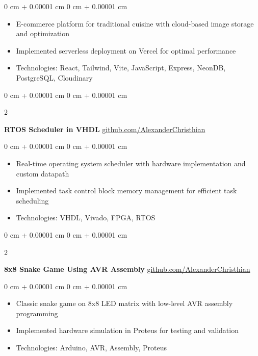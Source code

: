 \documentclass[10pt, letterpaper]{article}
\newenvironment{highlights}{
    \begin{itemize}[
        topsep=0.10 cm,
        parsep=0.10 cm,
        partopsep=0pt,
        itemsep=0pt,
        leftmargin=0 cm + 10pt
    ]
}{
    \end{itemize}
} %
\newenvironment{onecolentry}{
    \begin{adjustwidth}{
        0 cm + 0.00001 cm
    }{
        0 cm + 0.00001 cm
    }
}{
    \end{adjustwidth}
} %
\newenvironment{twocolentry}[2][]{
    \onecolentry
    \def\secondColumn{#2}
    \setcolumnwidth{\fill, 4.5 cm}
    \begin{paracol}{2}
}{
    \switchcolumn \raggedleft \secondColumn
    \end{paracol}
    \endonecolentry
} %
\begin{document}
        \vspace{0.10 cm}
        \begin{onecolentry}
            \begin{highlights}
                \item E-commerce platform for traditional cuisine with cloud-based image storage and optimization
                \item Implemented serverless deployment on Vercel for optimal performance
                \item Technologies: React, Tailwind, Vite, JavaScript, Express, NeonDB, PostgreSQL, Cloudinary
            \end{highlights}
        \end{onecolentry}


        \vspace{0.2 cm}

        \begin{twocolentry}{
            \href{https://github.com/AlexanderChristhian/RTOS_Task_Scheduler}{github.com/AlexanderChristhian}
        }
            \textbf{RTOS Scheduler in VHDL}\end{twocolentry}

        \vspace{0.10 cm}
        \begin{onecolentry}
            \begin{highlights}
                \item Real-time operating system scheduler with hardware implementation and custom datapath
                \item Implemented task control block memory management for efficient task scheduling
                \item Technologies: VHDL, Vivado, FPGA, RTOS
            \end{highlights}
        \end{onecolentry}


        \vspace{0.2 cm}

        \begin{twocolentry}{
            \href{https://github.com/AlexanderChristhian/8x8-Snake-Game-Using-AVR-Assembly}{github.com/AlexanderChristhian}
        }
            \textbf{8x8 Snake Game Using AVR Assembly}\end{twocolentry}

        \vspace{0.10 cm}
        \begin{onecolentry}
            \begin{highlights}
                \item Classic snake game on 8x8 LED matrix with low-level AVR assembly programming
                \item Implemented hardware simulation in Proteus for testing and validation
                \item Technologies: Arduino, AVR, Assembly, Proteus
            \end{highlights}
        \end{onecolentry}
\end{document}
